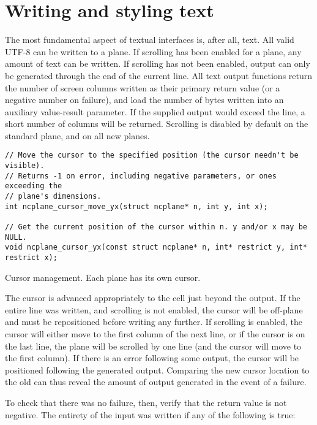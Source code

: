 \section{Writing and styling text}
\label{sec:output}
The most fundamental aspect of textual interfaces is, after all, text. All
valid UTF-8 can be written to a plane. If scrolling has been enabled for a
plane, any amount of text can be written. If scrolling has not been enabled,
output can only be generated through the end of the current line. All text
output functions return the number of screen columns written as their primary
return value (or a negative number on failure), and load the number of bytes
written into an auxiliary value-result parameter. If the supplied output would
exceed the line, a short number of columns will be returned. Scrolling is
disabled by default on the standard plane, and on all new planes.

\begin{listing}[!htb]
\begin{verbatim}
// Move the cursor to the specified position (the cursor needn't be visible).
// Returns -1 on error, including negative parameters, or ones exceeding the
// plane's dimensions.
int ncplane_cursor_move_yx(struct ncplane* n, int y, int x);

// Get the current position of the cursor within n. y and/or x may be NULL.
void ncplane_cursor_yx(const struct ncplane* n, int* restrict y, int* restrict x);
\end{verbatim}
\caption{Cursor management. Each plane has its own cursor.}
\label{list:cursor}
\end{listing}

The cursor is advanced appropriately to the cell just beyond the output. If the
entire line was written, and scrolling is not enabled, the cursor will be
off-plane and must be repositioned before writing any further. If scrolling is
enabled, the cursor will either move to the first column of the next line, or
if the cursor is on the last line, the plane will be scrolled by one line (and
the cursor will move to the first column). If there is an error following some
output, the cursor will be positioned following the generated output. Comparing
the new cursor location to the old can thus reveal the amount of output generated
in the event of a failure.

To check that there was no failure, then, verify that the return value is not
negative. The entirety of the input was written if any of the following is
true:

